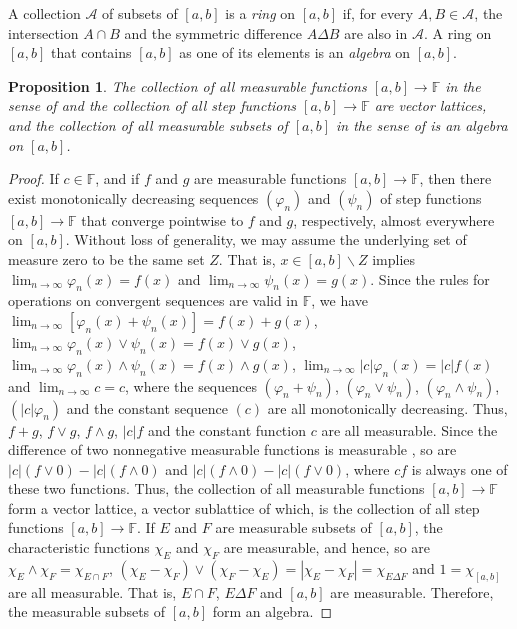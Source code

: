 \documentclass[11pt,a4paper]{article}
\newtheorem{proposition}[theorem]{Proposition}
\def\F{\mathbb{F}}
\def\lbrak{\left[}
\def\rbrak{\right]}
\def\abClosed{\lbrak a,b\rbrak}
\def\into{\longrightarrow}
\def\setdiff{\backslash}
\def\nseqlim{{\displaystyle\lim_{n\rightarrow\infty}}}
\def\abAlg{\mathcal{A}}
\begin{document}
A collection $\abAlg$ of subsets of $\abClosed$ is a \emph{ring} on $\abClosed$ if, for every $A,B\in\abAlg$, the intersection $A\cap B$ and the symmetric difference $A\Delta B$ are also in $\abAlg$. A ring on $\abClosed$ that contains $\abClosed$ as one of its elements is an \emph{algebra} on $\abClosed$.  
\begin{proposition} The collection of all measurable functions $\abClosed\into\F$ in the sense of \cite[p.~114]{can24} and the collection of all step functions $\abClosed\into\F$ are vector lattices, and the collection of all measurable subsets of $\abClosed$ in the sense of \cite[p.~115]{can24} is an algebra on $\abClosed$.
\end{proposition}
\begin{proof} If $c\in\F$, and if $f$ and $g$ are measurable functions $\abClosed\into\F$, then there exist monotonically decreasing sequences $(\varphi_n)$ and $(\psi_n)$ of step functions $\abClosed\into\F$ that converge pointwise to $f$ and $g$, respectively, almost everywhere on $\abClosed$. Without loss of generality, we may assume the underlying set of measure zero to be the same set $Z$. That is, $x\in\abClosed\setdiff Z$ implies $\nseqlim\varphi_n(x)=f(x)$ and $\nseqlim\psi_n(x)=g(x)$. Since the rules for operations on convergent sequences are valid in $\F$, we have $\nseqlim[\varphi_n(x)+\psi_n(x)]=f(x)+ g(x)$, $\nseqlim\varphi_n(x)\vee\psi_n(x)=f(x)\vee g(x)$, $\nseqlim\varphi_n(x)\wedge\psi_n(x)=f(x)\wedge g(x)$, $\nseqlim |c|\varphi_n(x)=|c|f(x)$ and $\nseqlim c=c$, where the sequences $(\varphi_n+\psi_n)$, $(\varphi_n\vee\psi_n)$, $(\varphi_n\wedge\psi_n)$, $(|c|\varphi_n)$ and the constant sequence $(c)$ are all monotonically decreasing. Thus, $f+g$, $f\vee g$, $f\wedge g$, $|c|f$ and the constant function $c$ are all measurable. Since the difference of two nonnegative measurable functions is measurable \cite[p.~115]{can24}, so are $|c|(f\vee 0)-|c|(f\wedge 0)$ and $|c|(f\wedge 0)-|c|(f\vee 0)$, where $cf$ is always one of these two functions. Thus, the collection of all measurable functions $\abClosed\into\F$ form a vector lattice, a vector sublattice of which, is the collection of all step functions $\abClosed\into\F$. If $E$ and $F$ are measurable subsets of $\abClosed$, the characteristic functions $\chi_E$ and $\chi_F$ are measurable, and hence, so are $\chi_E\wedge\chi_F=\chi_{E\cap F}$, $(\chi_E-\chi_F)\vee(\chi_F-\chi_E)=|\chi_E-\chi_F|=\chi_{E\Delta F}$ and $1=\chi_{\abClosed}$ are all measurable. That is, $E\cap F$, $E\Delta F$ and $\abClosed$ are measurable. Therefore, the measurable subsets of $\abClosed$ form an algebra.
\end{proof}
\end{document}

